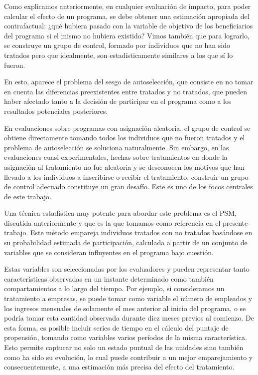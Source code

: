 \documentclass[../main.tex]{subfiles}
\begin{document}
Como explicamos anteriormente, en cualquier evaluación de impacto, para poder calcular el
efecto de un programa, se debe obtener una estimación apropiada del contrafactual: ¿qué
hubiera pasado con la variable de objetivo de los beneficiarios del programa si el mismo
no hubiera existido? Vimos también que para lograrlo, se construye un grupo de control,
formado por individuos que no han sido tratados pero que idealmente, son estadísticamente
similares a los que sí lo fueron.

En esto, aparece el problema del sesgo de autoselección, que consiste en no tomar en
cuenta las diferencias preexistentes entre tratados y no tratados, que pueden haber
afectado tanto a la decisión de participar en el programa como a los resultados
potenciales posteriores.

En evaluaciones sobre programas con asignación aleatoria, el grupo de control se obtiene
directamente tomando todos los individuos que no fueron tratados y el problema de
autoselección se soluciona naturalmente. Sin embargo, en las evaluaciones
cuasi-experimentales, hechas sobre tratamientos en donde la asignación al tratamiento no
fue aleatoria y se desconocen los motivos que han llevado a los individuos a inscribirse o
recibir el tratamiento, construir un grupo de control adecuado constituye un gran desafío.
Este es uno de los focos centrales de este trabajo.

Una técnica estadística muy potente para abordar este problema es el PSM, discutida
anteriormente y que es la que tomamos como referencia en el presente trabajo. Este método
empareja individuos tratados con no tratados basándose en su probabilidad estimada de
participación, calculada a partir de un conjunto de variables que se consideran
influyentes en el programa bajo cuestión.

Estas variables son seleccionadas por los evaluadores y pueden representar tanto
características observadas en un instante determinado como también compartamientos a lo
largo del tiempo. Por ejemplo, si consideramos un tratamiento a empresas, se puede tomar
como variable el número de empleados y los ingresos mensuales de solamente el mes anterior
al inicio del programa, o se podría tomar esta cantidad observada durante diez meses
previos al comienzo. De esta forma, es posible incluir series de tiempo en el cálculo del
puntaje de propensión, tomando como variables varios períodos de la misma característica.
Esto permite capturar no solo un estado puntual de las unidades sino también como ha sido
su evolución, lo cual puede contribuir a un mejor emparejamiento y consecuentemente, a una
estimación más precisa del efecto del tratamiento.
\end{document}

